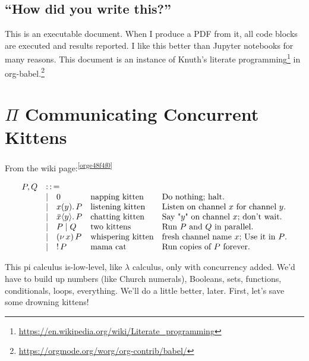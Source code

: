 \documentclass[10pt,oneside,x11names]{article}
\newcommand{\Coloneqq}{\mathrel{\vcenter{\hbox{$:\,:\,=$}}{}}}
\newcommand\napping    [0]{0}
\newcommand\chatting   [3]{\bar{#1}\langle{#2}\rangle{}.\,#3}
\newcommand\listening  [3]{#1(#2).\,#3}
\newcommand\two        [2]{#1\mathrel{\vert}{#2}}
\newcommand\whispering [2]{(\nu\,#1)\,{#2}}
\newcommand\mama       [1]{!\,{#1}}
\theoremstyle{definition}
\theoremstyle{warning}
\begin{document}
\subsection{``How did you write this?''}
\label{sec:org921edfa}

This is an executable document. When I produce a PDF from it, all
code blocks are executed and results reported. I like this better
than Jupyter notebooks for many reasons. This document
is an instance of Knuth's literate programming\footnote{\url{https://en.wikipedia.org/wiki/Literate\_programming}}
in org-babel.\footnote{\url{https://orgmode.org/worg/org-contrib/babel/}}

\newpage
\section{\(\Pi\) Communicating Concurrent Kittens}
\label{sec:org098118b}

From the wiki page:\textsuperscript{\ref{orge48f4f0}}

\begin{equation}
\begin{array}{clll}
  P, Q & \Coloneqq \\
       & | \quad \napping            & \textrm{napping kitten}    & \textrm{Do nothing; halt.}                                    \\
       & | \quad \listening{x}{y}{P} & \textrm{listening kitten}  & \textrm{Listen on channel }x\textrm{ for channel }y\textrm{.} \\
       & | \quad \chatting{x}{y}{P}  & \textrm{chatting kitten}   & \textrm{Say "}y\textrm{" on channel }x\textrm{; don't wait.}  \\
       & | \quad \two{P}{Q}          & \textrm{two kittens}       & \textrm{Run }P\textrm{ and }Q\textrm{ in parallel.}           \\
       & | \quad \whispering{x}{P}   & \textrm{whispering kitten} & \textrm{fresh channel name }x\textrm{; Use it in }P\textrm{.} \\
       & | \quad \mama{P}            & \textrm{mama cat}          & \textrm{Run copies of }P\textrm{ forever.} \\
\end{array}
\end{equation}

This pi calculus is-low-level, like \(\lambda\) calculus, only with
concurrency added. We'd have to build up numbers (like Church
numerals), Booleans, sets, functions, conditionals, loops,
everything. We'll do a little better, later. First, let's save
some drowning kittens!
\end{document}
